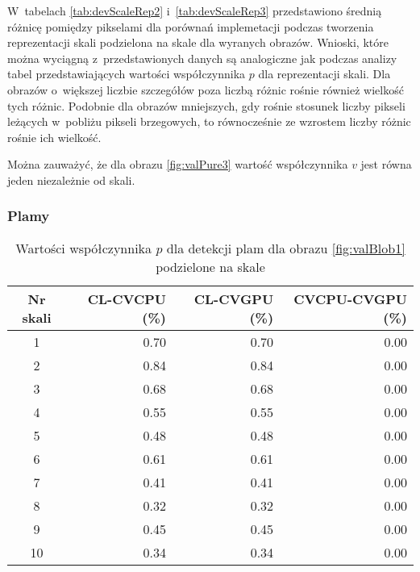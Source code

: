 W~tabelach \ref{tab:devScaleRep2} i~\ref{tab:devScaleRep3} przedstawiono średnią różnicę pomiędzy pikselami dla porównań implemetacji podczas tworzenia reprezentacji skali podzielona na skale dla wyranych obrazów. Wnioski, które można wyciągną z~przedstawionych danych są analogiczne jak podczas analizy tabel przedstawiających wartości współczynnika $ p $ dla reprezentacji skali. Dla obrazów o~większej liczbie szczegółów poza liczbą różnic rośnie również wielkość tych różnic. Podobnie dla obrazów mniejszych, gdy rośnie stosunek liczby pikseli leżących w~pobliżu pikseli brzegowych, to równocześnie ze wzrostem liczby różnic rośnie ich wielkość.

Można zauważyć, że dla obrazu \ref{fig:valPure3} wartość współczynnika $ v $ jest równa jeden niezależnie od skali.

\subsubsection{Plamy}
\label{subsubsec:plamyTabele}

\begin{center}
\begin{table}
\centering
\caption{Wartości współczynnika $ p $ dla detekcji plam dla obrazu \ref{fig:valBlob1} podzielone na skale}
\label{tab:imageScaleBlob1}
\begin{tabular}{|c|r|r|r|}
 \hline
Nr skali & CL-CVCPU (\%) & CL-CVGPU (\%) & CVCPU-CVGPU (\%) \\ \hline
1        & 0.70     & 0.70     & 0.00        \\ \hline
2        & 0.84     & 0.84     & 0.00       \\ \hline
3        & 0.68     & 0.68     & 0.00       \\ \hline
4        & 0.55     & 0.55     & 0.00        \\ \hline
5        & 0.48     & 0.48     & 0.00        \\ \hline
6        & 0.61     & 0.61     & 0.00        \\ \hline
7        & 0.41     & 0.41     & 0.00        \\ \hline
8        & 0.32     & 0.32     & 0.00        \\ \hline
9        & 0.45     & 0.45     & 0.00        \\ \hline
10       & 0.34     & 0.34     & 0.00        \\ \hline
\end{tabular}
\end{table}
\end{center}

